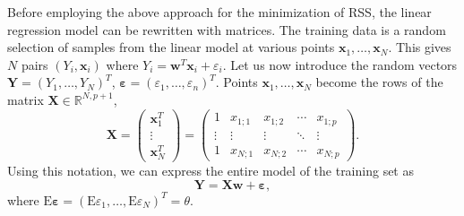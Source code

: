 \documentclass[a4paper]{article}
\begin{document}
	Before employing the above approach for the minimization of RSS, the linear
	regression model can be rewritten with matrices. The training data is a random
	selection of samples from the linear model at various points
	$\boldsymbol{x}_1, \ldots, \boldsymbol{x}_N$. This gives $N$ pairs $(Y_i, \boldsymbol{x}_i)$ 
	where $Y_i = \boldsymbol{w}^T \boldsymbol{x}_i + \varepsilon_i$. Let us now introduce
	the random vectors $\boldsymbol{Y} = (Y_1, \ldots, Y_N)^T$,
	$\boldsymbol{\varepsilon} = (\varepsilon_1, \ldots, \varepsilon_n)^T$. Points
	$\boldsymbol{x}_1, \ldots, \boldsymbol{x}_N$ become the rows of the matrix
	$\boldsymbol{X} \in \mathbb{R}^{N, p + 1}$,\[
	\boldsymbol{X} =
	\begin{pmatrix}
		\boldsymbol{x}_1^T \\
		\vdots \\
		\boldsymbol{x}_N^T
	\end{pmatrix} =
	\begin{pmatrix}
		1 & x_{1;1} & x_{1;2} & \cdots & x_{1;p} \\
		\vdots & \vdots & \vdots & \ddots & \vdots \\
		1 & x_{N;1} & x_{N;2} & \cdots & x_{N;p}
	\end{pmatrix} 
	.\] Using this notation, we can express the entire model of the training set
	as \[
	\boldsymbol{Y} = \boldsymbol{X} \boldsymbol{w} + \boldsymbol{\varepsilon}
	,\] where $\mathrm{E}\boldsymbol{\varepsilon} =
	(\mathrm{E}\varepsilon_1, \ldots, \mathrm{E}\varepsilon_N)^T = \theta$.
\end{document}
